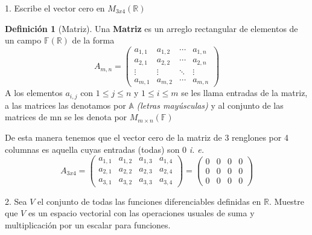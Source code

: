 \documentclass[letterpaper]{article}
\newcommand{\F}{\mathds{F}}
\newcommand{\R}{\mathds{R}}
\renewcommand{\*}{\cdot}
\theoremstyle{definition}
\newtheorem{definition}{Definición}[section]
\begin{document}
	1. Escribe el vector cero en $M_{3x4}(\mathbb{R})$
		\begin{definition}[Matriz]
		Una \textbf{Matriz} es un arreglo rectangular de elementos de un campo $ \F(\R) $ de la forma
		\begin{equation*}
		A_{m,n} = 
		\begin{pmatrix}
		a_{1,1} & a_{1,2} & \cdots & a_{1,n} \\
		a_{2,1} & a_{2,2} & \cdots & a_{2,n} \\
		\vdots  & \vdots  & \ddots & \vdots  \\
		a_{m,1} & a_{m,2} & \cdots & a_{m,n} 
		\end{pmatrix}
		\end{equation*}
		A los elementos $ a_{i,j} $ con $ 1 \leq j \leq n $ y $ 1 \leq i \leq m $ se les llama entradas de la matriz, a las matrices las denotamos por $ \mathds{A} $ 				\textit{(letras mayúsculas)} y al conjunto de las matrices de mn se les denota por $ M_{m\times n}(\F) $
		
	\end{definition}
	De esta manera tenemos que el vector cero de la matriz de 3 renglones por 4 columnas es aquella cuyas entradas (todas) son 0 \textit{i. e. }
		\begin{equation*}
		A_{3x4} = 
		\begin{pmatrix}
		a_{1,1} & a_{1,2} & a_{1,3} & a_{1,4} \\
		a_{2,1} & a_{2,2} & a_{2,3} & a_{2,4} \\
		a_{3,1} & a_{3,2} & a_{3,3} & a_{3,4} 
		\end{pmatrix}
		= 
		\begin{pmatrix}
		0 & 0 & 0 & 0\\
		0 & 0 & 0 & 0 \\
		0 & 0 & 0 & 0
		\end{pmatrix}
		\end{equation*}
		
 2. Sea $V$ el conjunto de todas las funciones diferenciables definidas en $\mathbb{R}$. Muestre que $V$ es un espacio vectorial con las operaciones usuales de suma y multiplicación por un escalar para funciones. 
	
\end{document}
